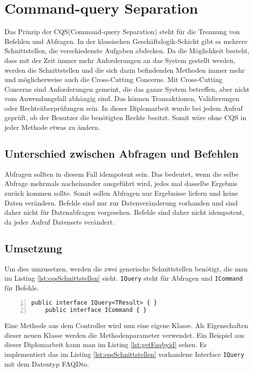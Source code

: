 \chapter{Command-query Separation}
Das Prinzip der CQS(Command-query Separation) steht für die Trennung von Befehlen und Abfragen. In der klassischen Geschäftslogik-Schicht gibt es mehrere Schnittstellen, die verschiedenste Aufgaben abdecken. Da die Möglichkeit besteht, dass  mit der Zeit immer mehr Anforderungen an das System gestellt werden, werden die Schnittstellen und die sich darin befindenden Methoden immer mehr und möglicherweise auch die Cross-Cutting Concerns. Mit Cross-Cutting Concerns sind Anforderungen gemeint, die das ganze System betreffen, aber nicht vom Anwendungsfall abhängig sind. Das können Transaktionen, Validierungen oder Rechteüberprüfungen sein. In dieser Diplomarbeit wurde bei jedem Aufruf geprüft, ob der Benutzer die benötigten Rechte besitzt. Somit wäre ohne CQS in jeder Methode etwas zu ändern. \autocite{cqsSOLIDeArchitektur}\\
\section{Unterschied zwischen Abfragen und Befehlen}
Abfragen sollten in diesem Fall idempotent sein. Das bedeutet, wenn die selbe Abfrage mehrmals nacheinander ausgeführt wird, jedes mal dasselbe Ergebnis zurück kommen sollte. Somit sollen Abfragen nur Ergebnisse liefern und keine Daten verändern.
Befehle sind nur zur Datenveränderung vorhanden und sind daher nicht für Datenabfragen vorgesehen. Befehle sind daher nicht idempotent, da jeder Aufruf Datensets verändert.
\section{Umsetzung}
Um dies umzusetzen, werden die zwei generische Schnittstellen benötigt, die man im Listing \ref{lst:cqsSchnittstellen} sieht. \texttt{IQuery} steht für Abfragen und \texttt{ICommand} für Befehle.
\begin{lstlisting}[caption={CQS-Schnittstellen},captionpos=b, numbers=left, backgroundcolor=\color{black!10},language={[Sharp]C}, label={lst:cqsSchnittstellen}]
	public interface IQuery<TResult> { }
	public interface ICommand { }
\end{lstlisting}
Eine Methode aus dem Controller wird nun eine eigene Klasse. Als Eigenschaften dieser neuen Klasse werden die Methodenparameter verwendet. Ein Beispiel aus dieser Diplomarbeit kann man im Listing \ref{lst:getFaqbyid} sehen. Es implementiert das im Listing \ref{lst:cqsSchnittstellen} vorhandene Interface \texttt{IQuery} mit dem Datentyp FAQDto.

